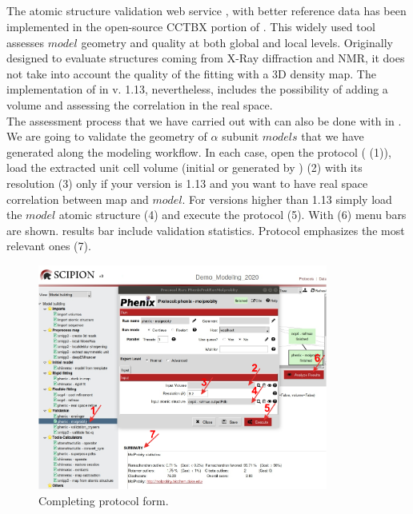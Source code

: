  \subsection*{\molprobity}
 
 The atomic structure validation web service \molprobity, with better reference data has been implemented in the open-source CCTBX portion of \phenix \citep{williams2018}. This widely used tool assesses $model$ geometry and quality at both global and local levels. Originally designed to evaluate structures coming from X-Ray diffraction and NMR, it does not take into account the quality of the fitting with a 3D density map.  The implementation of \molprobity in \phenix v. 1.13, nevertheless, includes the possibility of adding a volume and assessing the correlation in the real space.\\
 
 The assessment process that we have carried out with \emringer can also be done with \molprobity in \scipion. We are going to validate the geometry of  $\alpha$ subunit $models$ that we have generated along the modeling workflow. In each case, open the  protocol ( (1)), load the extracted unit cell volume (initial or generated by \coot) (2) with its resolution (3) only if your \phenix version is 1.13 and you want to have real space correlation between map and $model$. For \phenix versions higher than 1.13 simply load the $model$ atomic structure (4) and execute the protocol (5). With  (6) menu bars are shown. \molprobity results bar include validation statistics. Protocol  emphasizes the most relevant ones (7).\\
 
 \begin{figure}[H]
  \centering 
  \captionsetup{width=.7\linewidth} 
  \includegraphics[width=0.85\textwidth]{Images/Fig35}
  \caption{Completing \molprobity protocol form.}
  \label{fig:molprobity_protocol}
  \end{figure}
  
